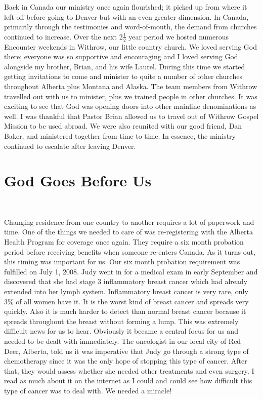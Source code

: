 \documentclass[oneside,12pt]{book}
\begin{document}
Back in Canada our ministry once again flourished; it picked up from where it left off before going to Denver but with an even greater dimension. In Canada, primarily through the testimonies and word-of-mouth, the demand from churches continued to increase. Over the next 2$\frac{1}{2}$ year period we hosted numerous Encounter weekends in Withrow, our little country church. We loved serving God there; everyone was so supportive and encouraging and I loved serving God alongside my brother, Brian, and his wife Laurel. During this time we started getting invitations to come and minister to quite a number of other churches throughout Alberta plus Montana and Alaska. The team members from Withrow travelled out with us to minister, plus we trained people in other churches. It was exciting to see that God was opening doors into other mainline denominations as well. I was thankful that Pastor Brian allowed us to travel out of Withrow Gospel Mission to be used abroad. We were also reunited with our good friend, Dan Baker, and ministered together from time to time. In essence, the ministry continued to escalate after leaving Denver.


\section{God Goes Before Us}
\

Changing residence from one country to another requires a lot of paperwork and time. One of the things we needed to care of was re-registering with the Alberta Health Program for coverage once again. They require a six month probation period before receiving benefits when someone re-enters Canada. As it turns out, this timing was important for us. Our six month probation requirement was fulfilled on July 1, 2008. Judy went in for a medical exam in early September and discovered that she had stage 3 inflammatory breast cancer which had already extended into her lymph system. Inflammatory breast cancer is very rare, only 3\% of all women have it. It is the worst kind of breast cancer and spreads very quickly. Also it is much harder to detect than normal breast cancer because it spreads throughout the breast without forming a lump. This was extremely difficult news for us to hear. Obviously it became a central focus for us and needed to be dealt with immediately. The oncologist in our local city of Red Deer, Alberta, told us it was imperative that Judy go through a strong type of chemotherapy since it was the only hope of stopping this type of cancer. After that, they would assess whether she needed other treatments and even surgery. I read as much about it on the internet as I could and could see how difficult this type of cancer was to deal with. We needed a miracle!
\end{document}

